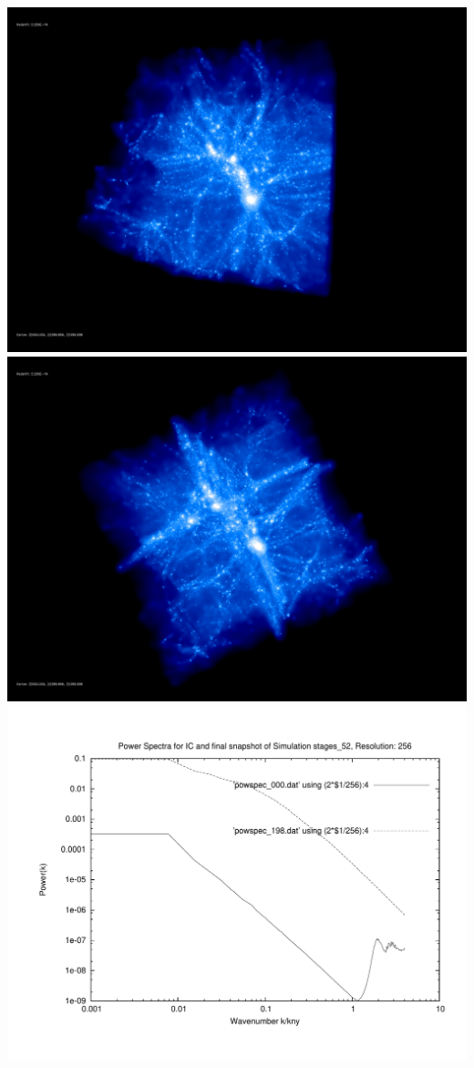 \includegraphics[scale=0.1]{r256/stages_52/rotate_00074.jpg} 
\includegraphics[scale=0.1]{r256/stages_52/rotate_00131.jpg}  \\

\includegraphics[scale=0.5]{r256/stages_52/plot_powspec_stages_52}

